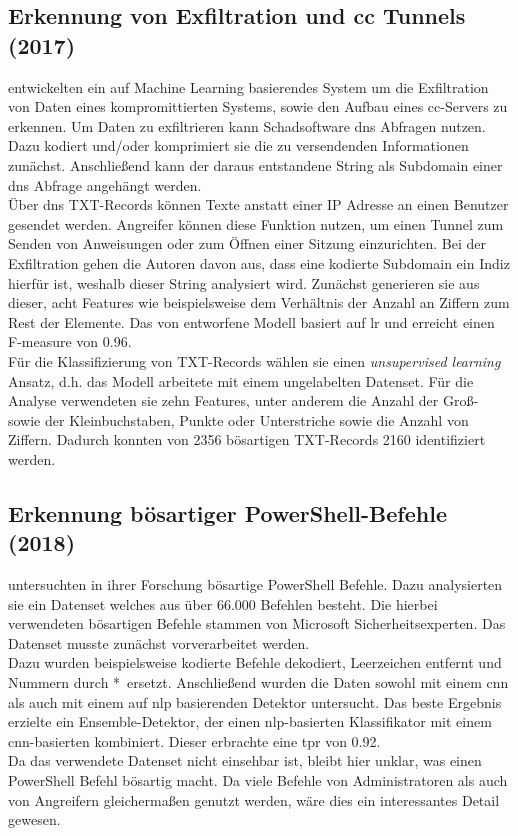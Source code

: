 \documentclass[
    12pt, %
    DIV10,
    ngerman, %
    a4paper, %
    oneside, %
    titlepage, %
    parskip=half, %
    headings=normal, %
    listof=totoc, %
    bibliography=totoc, %
    index=totoc, %
    captions=tableheading, %
    final %
]{scrreprt}
\begin{document}
\subsection{Erkennung von Exfiltration und \acs{cc} Tunnels (2017)}
\textcite{Das2018} entwickelten ein auf Machine Learning basierendes System um die Exfiltration von Daten eines kompromittierten Systems, sowie den Aufbau eines \ac{cc}-Servers zu erkennen. Um Daten zu exfiltrieren kann Schadsoftware \ac{dns} Abfragen nutzen. Dazu kodiert und/oder komprimiert sie die zu versendenden Informationen zunächst. Anschlie{\ss}end kann der daraus entstandene String als Subdomain einer \ac{dns} Abfrage angehängt werden.\\
Über \ac{dns} TXT-Records können Texte anstatt einer IP Adresse an einen Benutzer gesendet werden. Angreifer können diese Funktion nutzen, um einen Tunnel zum Senden von Anweisungen oder zum Öffnen einer Sitzung einzurichten.
Bei der Exfiltration gehen die Autoren davon aus, dass eine kodierte Subdomain ein Indiz hierfür ist, weshalb dieser String analysiert wird. Zunächst generieren sie aus dieser, acht Features wie beispielsweise dem Verhältnis der Anzahl an Ziffern zum Rest der Elemente. Das von \textcite{Das2018} entworfene Modell basiert auf \acl{lr} und erreicht einen F-measure von 0.96.\\
Für die Klassifizierung von TXT-Records wählen sie einen \emph{unsupervised learning} Ansatz, d.h. das Modell arbeitete mit einem ungelabelten Datenset. Für die Analyse verwendeten sie zehn Features, unter anderem die Anzahl der Gro{\ss}- sowie der Kleinbuchstaben, Punkte oder Unterstriche sowie die Anzahl von Ziffern. Dadurch konnten von 2356 bösartigen TXT-Records 2160 identifiziert werden.
%
\subsection{Erkennung bösartiger PowerShell-Befehle (2018)}
\textcite{Hendler2018} untersuchten in ihrer Forschung bösartige PowerShell Befehle. Dazu analysierten sie ein Datenset welches aus über 66.000 Befehlen besteht. Die hierbei verwendeten bösartigen Befehle stammen von Microsoft Sicherheitsexperten. Das Datenset musste zunächst vorverarbeitet werden.\\Dazu wurden beispielsweise kodierte Befehle dekodiert, Leerzeichen entfernt und Nummern durch *\  ersetzt. Anschlie{\ss}end wurden die Daten sowohl mit einem \ac{cnn} als auch mit einem auf \ac{nlp} basierenden Detektor untersucht. Das beste Ergebnis erzielte ein Ensemble-Detektor, der einen \ac{nlp}-basierten Klassifikator mit einem \ac{cnn}-basierten kombiniert. Dieser erbrachte eine \ac{tpr} von 0.92.\\
Da das verwendete Datenset nicht einsehbar ist, bleibt hier unklar, was einen PowerShell Befehl bösartig macht. Da viele Befehle von Administratoren als auch von Angreifern gleicherma{\ss}en genutzt werden, wäre dies ein interessantes Detail gewesen.
%
\end{document}
